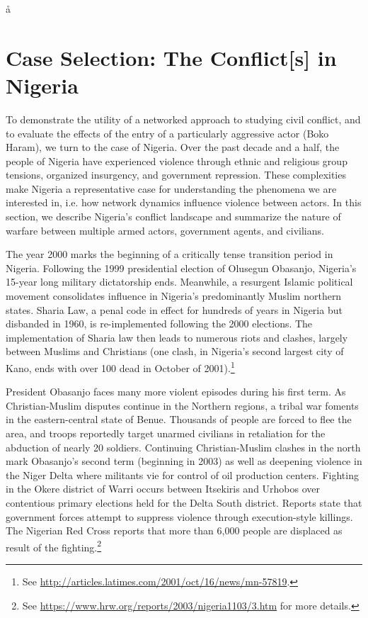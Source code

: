 å\section*{Case Selection: The Conflict[s] in Nigeria}

To demonstrate the utility of a networked approach to studying civil conflict, and to evaluate the effects of the entry of a particularly aggressive actor (Boko Haram), we turn to the case of Nigeria. Over the past decade and a half, the people of Nigeria have experienced violence through ethnic and religious group tensions, organized insurgency, and government repression. These complexities make Nigeria a representative case for understanding the phenomena we are interested in, i.e. how network dynamics influence violence between actors. In this section, we describe Nigeria's conflict landscape and summarize the nature of warfare between multiple armed actors, government agents, and civilians. 

The year 2000 marks the beginning of a critically tense transition period in Nigeria. Following the 1999 presidential election of Olusegun Obasanjo, Nigeria's 15-year long military dictatorship ends. Meanwhile, a resurgent Islamic political movement consolidates influence in Nigeria's predominantly Muslim northern states. Sharia Law, a penal code in effect for hundreds of years in Nigeria but disbanded in 1960, is re-implemented following the 2000 elections. The implementation of Sharia law then leads to numerous riots and clashes, largely between Muslims and Christians (one clash, in Nigeria's second largest city of Kano, ends with over 100 dead in October of 2001).\footnote{See \url{http://articles.latimes.com/2001/oct/16/news/mn-57819}.}

President Obasanjo faces many more violent episodes during his first term. As Christian-Muslim disputes continue in the Northern regions, a tribal war foments in the eastern-central state of Benue. Thousands of people are forced to flee the area, and troops reportedly target unarmed civilians in retaliation for the abduction of nearly 20 soldiers. Continuing Christian-Muslim clashes in the north mark Obasanjo's second term (beginning in 2003) as well as deepening violence in the Niger Delta where militants vie for control of oil production centers. Fighting in the Okere district of Warri occurs between Itsekiris and Urhobos over contentious primary elections held for the Delta South district. Reports state that government forces attempt to suppress violence through execution-style killings. The Nigerian Red Cross reports that more than 6,000 people are displaced as result of the fighting.\footnote{See \url{https://www.hrw.org/reports/2003/nigeria1103/3.htm} for more details.}


